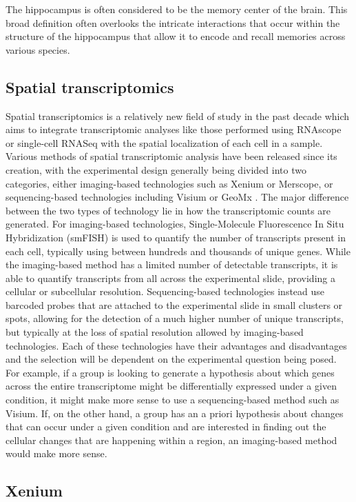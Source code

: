 \documentclass{article}
\begin{document}
The hippocampus is often considered to be the memory center of the brain. This broad definition often overlooks the intricate interactions that occur within the structure of the hippocampus that allow it to encode and recall memories across various species. 

\subsection{Spatial transcriptomics}

Spatial transcriptomics is a relatively new field of study in the past decade which aims to integrate transcriptomic analyses like those performed using RNAscope or single-cell RNASeq with the spatial localization of each cell in a sample. Various methods of spatial transcriptomic analysis have been released since its creation, with the experimental design generally being divided into two categories, either imaging-based technologies such as Xenium or Merscope, or sequencing-based technologies including Visium or GeoMx \cite{choosingST}. The major difference between the two types of technology lie in how the transcriptomic counts are generated. For imaging-based technologies, Single-Molecule Fluorescence In Situ Hybridization (smFISH) is used to quantify the number of transcripts present in each cell, typically using between hundreds and thousands of unique genes. While the imaging-based method has a limited number of detectable transcripts, it is able to quantify transcripts from all across the experimental slide, providing a cellular or subcellular resolution. Sequencing-based technologies instead use barcoded probes that are attached to the experimental slide in small clusters or spots, allowing for the detection of a much higher number of unique transcripts, but typically at the loss of spatial resolution allowed by imaging-based technologies. Each of these technologies have their advantages and disadvantages and the selection will be dependent on the experimental question being posed. For example, if a group is looking to generate a hypothesis about which genes across the entire transcriptome might be differentially expressed under a given condition, it might make more sense to use a sequencing-based method such as Visium. If, on the other hand, a group has an a priori hypothesis about changes that can occur under a given condition and are interested in finding out the cellular changes that are happening within a region, an imaging-based method would make more sense. 

\subsection{Xenium}
\end{document}
